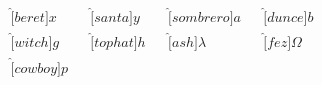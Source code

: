 \documentclass{article}
\begin{document}
\vspace*{-9mm}
\begin{align*}
\hat[beret]{x}&&
\hat[santa]{y}&&
\hat[sombrero]{a}&&
\hat[dunce]{b}\\
\hat[witch]{g}&&
\hat[tophat]{h}&&
\hat[ash]{\lambda}&&
\hat[fez]{\Omega}\\
\hat[cowboy]{p}
\end{align*}
\end{document}
